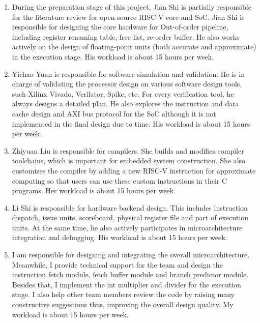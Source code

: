 \begin{enumerate}
  \item During the preparation stage of this project, Jian Shi is partially responsible for the literature review for open-source RISC-V core and SoC. Jian Shi is responsible for designing the core hardware for Out-of-order pipeline, including register renaming table, free list, re-order buffer. He also works actively on the design of floating-point units (both accurate and approximate) in the execution stage. His workload is about 15 hours per week.
  \item Yichao Yuan is responsible for software simulation and validation. He is in charge of validating the processor design on various software design tools, such Xilinx Vivado, Verilator, Spike, etc. For every verification tool, he always designs a detailed plan. He also explores the instruction and data cache design and AXI bus protocol for the SoC although it is not implemented in the final design due to time. His workload is about 15 hours per week.
  \item Zhiyuan Liu is responsible for compilers. She builds and modifies compiler toolchains, which is important for embedded system construction. She also customizes the compiler by adding a new RISC-V instruction for approximate computing so that users can use these custom instructions in their C programs. Her workload is about 15 hours per week.
  \item Li Shi is responsible for hardware backend design. This includes instruction dispatch, issue units, scoreboard, physical register file and part of execution units. At the same time, he also actively participates in microarchitecture integration and debugging. His workload is about 15 hours per week.
  \item I am responsible for designing and integrating the overall microarchitecture. Meanwhile, I provide technical support for the team and design the instruction fetch module, fetch buffer module and branch predictor module. Besides that, I implement the int multiplier and divider for the execution stage. I also help other team members review the code by raising many constructive suggestions thus, improving the overall design quality. My workload is about 15 hours per week.
\end{enumerate}

